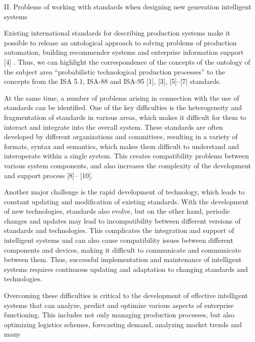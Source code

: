 \documentclass [11pt,a4paper]{article}
\begin{document}
\begin{multicols}{2}
\begin{center}
    

II. Problems of working with standards when designing
new generation intelligent systems\end{center}
\par Existing international standards for describing production systems make it possible to release an ontological
approach to solving problems of production automation,
building recommender systems and enterprise information support [4] . Thus, we can highlight the correspondence of the concepts of the ontology of the subject area
“probabilistic technological production processes” to the
concepts from the ISA 5.1, ISA-88 and ISA-95 [1], [3],
[5]–[7] standards.
\setlength{\parskip}{0cm}
\par At the same time, a number of problems arising in
connection with the use of standards can be identified.
One of the key difficulties is the heterogeneity and
fragmentation of standards in various areas, which makes
it difficult for them to interact and integrate into the
overall system. These standards are often developed by
different organizations and committees, resulting in a
variety of formats, syntax and semantics, which makes
them difficult to understand and interoperate within a
single system. This creates compatibility problems between various system components, and also increases the
complexity of the development and support process [8]–
[10].
\par Another major challenge is the rapid development
of technology, which leads to constant updating and
modification of existing standards. With the development
of new technologies, standards also evolve, but on the
other hand, periodic changes and updates may lead to
incompatibility between different versions of standards
and technologies. This complicates the integration and
support of intelligent systems and can also cause compatibility issues between different components and devices,
making it difficult to communicate and communicate between them. Thus, successful implementation and maintenance of intelligent systems requires continuous updating
and adaptation to changing standards and technologies.
\par Overcoming these difficulties is critical to the development of effective intelligent systems that can analyze, predict and optimize various aspects of enterprise
functioning. This includes not only managing production processes, but also optimizing logistics schemes,
forecasting demand, analyzing market trends and many

\end{multicols}
\end{document}

